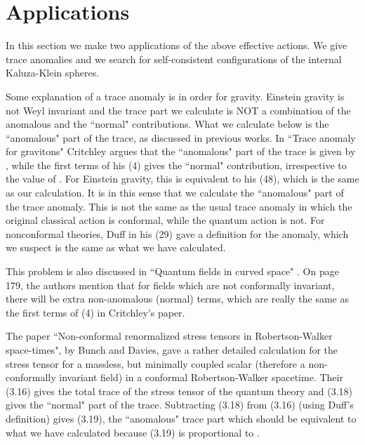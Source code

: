 \documentclass[a4paper,aps,preprint,groupedaddress,showpacs]{revtex4}
\begin{document}
\section{Applications}

In this section we make two applications of the above effective actions. 
We give trace anomalies and we search for self-consistent
configurations of the internal Kaluza-Klein spheres. 

Some explanation of a trace anomaly is in order for gravity. 
Einstein gravity is
not Weyl invariant and the trace part we calculate is
NOT a combination of the anomalous and the ``normal" contributions. What
we calculate below is the ``anomalous" part of the trace, as discussed
in previous works. In ``Trace anomaly for gravitons" \cite{RC} Critchley
argues that the ``anomalous" part of the trace is given by \coordHE{}, while the first terms of
his (4) gives the ``normal" contribution, irrespective to the value of \myHighlight{$\zeta$}\coordHE{}.
For Einstein gravity, this is equivalent
to his (48), which is the same as our calculation. It is in this sense that we
calculate the ``anomalous" part of the trace anomaly. This is not the same
as the usual trace anomaly in which the
original classical action is conformal, while the quantum action is not.
For nonconformal theories, Duff \cite{MJD} in his (29)
gave a definition for the anomaly, which we suspect is the same as what we have
calculated.

This problem is also discussed in ``Quantum fields in curved space"
\cite{BiD}. On page 179, the authors mention
that for fields which are not conformally invariant, there will be extra
non-anomalous (normal) terms, which are really the same as the first terms
of (4) in Critchley's paper.    

    
The paper ``Non-conformal renormalized stress tensors in Robertson-Walker space-times", 
\cite{BuD} by Bunch and Davies,
gave a rather detailed calculation for the stress tensor for a massless,
but minimally coupled scalar (therefore a non-conformally invariant field) in a conformal
Robertson-Walker spacetime. Their (3.16) gives the total trace of the
stress tensor of the quantum theory and (3.18) gives the ``normal" part
of the trace. Subtracting (3.18) from (3.16) (using Duff's definition) gives
(3.19), the ``anomalous" trace part which should be equivalent to
what we have calculated because (3.19) is proportional to \coordHE{}. 
                
\end{document}
